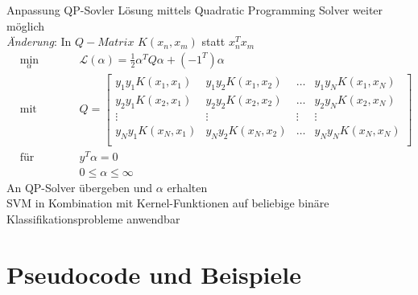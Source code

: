 \documentclass[ngerman]{beamer}
\newcommand{\Lagr}{\mathcal{L}}
\begin{document}
\begin{frame}{Anpassung QP-Sovler}
    Lösung mittels Quadratic Programming Solver weiter möglich \\
    \emph{Änderung}: In $Q-Matrix$ $K(x_{n}, x_{m})$ statt $x_{n}^{T}x_{m}$ \\ \pause
    \begin{subequations} \label{subeq:q1_pres}
    \begin{alignat*}{2}
        &\!\min_{\alpha}        &\qquad& \Lagr(\alpha) = \frac{1}{2} \alpha^{T} Q \alpha + (-1^T) \alpha \label{eq:qp1_pres}\\
        &\text{mit} &      & Q = \begin{bmatrix}
                                     y_{1}y_{1} K(x_{1}, x_{1}) & y_{1}y_{2} K(x_{1}, x_{2}) & \dots & y_{1}y_{N} K(x_{1}, x_{N})\\
                                     y_{2}y_{1} K(x_{2}, x_{1}) & y_{2}y_{2} K(x_{2}, x_{2}) & \dots & y_{2}y_{N} K(x_{2}, x_{N})\\
                                     \vdots & \vdots & \vdots & \vdots\\
                                     y_{N}y_{1} K(x_{N}, x_{1}) & y_{N}y_{2} K(x_{N}, x_{2}) & \dots & y_{N}y_{N} K(x_{N}, x_{N})\\
        \end{bmatrix}\\
        &\text{für} & & y^{T} \alpha = 0\\
        & & & 0 \leq \alpha \leq \infty
    \end{alignat*}
    \end{subequations} \pause
    An QP-Solver übergeben und $\alpha$ erhalten \\ \pause
    SVM in Kombination mit Kernel-Funktionen auf beliebige binäre Klassifikationsprobleme anwendbar
\end{frame}

\section{Pseudocode und Beispiele}\label{sec:pseudobsopres}
\end{document}
